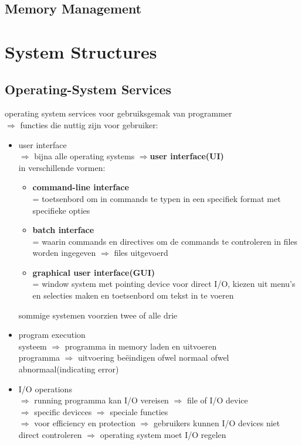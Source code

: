 \documentclass{report}
\begin{document}
\section{Memory Management}


\chapter{System Structures}
\section{Operating-System Services}
operating system services voor gebruiksgemak van programmer
\\$\Rightarrow$ functies die nuttig zijn voor gebruiker:
\begin{itemize}
\item user interface
\\ $\Rightarrow$ bijna alle operating systems $\Rightarrow$\textbf{user interface(UI)}
\\in verschillende vormen:
\begin{itemize}
\item \textbf{command-line interface}
\\= toetsenbord om in commands te typen in een specifiek format met specifieke opties
\item \textbf{batch interface}
\\= waarin commands en directives om de commands te controleren in files worden ingegeven $\Rightarrow$ files uitgevoerd
\item \textbf{graphical user interface(GUI)}
\\= window system met pointing device voor direct I/O, kiezen uit menu's en selecties maken en toetsenbord om tekst in te voeren
\end{itemize}
sommige systemen voorzien twee of alle drie
\item program execution
\\systeem $\Rightarrow$ programma in memory laden en uitvoeren
\\programma $\Rightarrow$ uitvoering be\"eindigen ofwel normaal ofwel abnormaal(indicating error)
\item I/O operations
\\$\Rightarrow$ running programma kan I/O vereisen $\Rightarrow$ file of I/O device
\\$\Rightarrow$ specific devicces $\Rightarrow$ speciale functies
\\$\Rightarrow$ voor efficiency en protection $\Rightarrow$ gebruikers kunnen I/O devices niet direct controleren $\Rightarrow$ operating system moet I/O regelen

\end{itemize}
\end{document}
